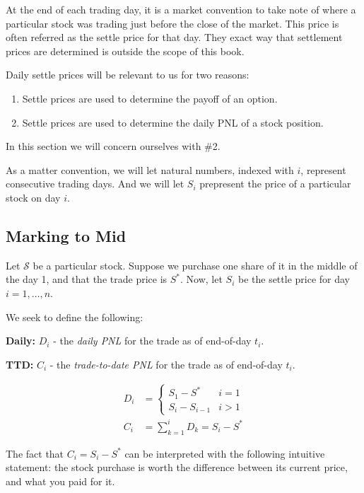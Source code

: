 \documentclass[11pt,]{krantz}
\begin{document}
At the end of each trading day, it is a market convention to take note of where a particular stock was trading just before the close of the market. This price is often referred as the settle price for that day. They exact way that settlement prices are determined is outside the scope of this book.

Daily settle prices will be relevant to us for two reasons:

\begin{enumerate}
\def\labelenumi{\arabic{enumi}.}
\item
  Settle prices are used to determine the payoff of an option.
\item
  Settle prices are used to determine the daily PNL of a stock position.
\end{enumerate}

In this section we will concern ourselves with \#2.

As a matter convention, we will let natural numbers, indexed with \(i\), represent consecutive trading days. And we will let \(S_{i}\) prepresent the price of a particular stock on day \(i\).

\subsection{Marking to Mid}\label{marking-to-mid}

Let \(\mathcal{S}\) be a particular stock. Suppose we purchase one share of it in the middle of the day 1, and that the trade price is \(S^{*}\). Now, let \(S_{i}\) be the settle price for day \(i=1,\ldots,n\).

We seek to define the following:

\textbf{Daily:} \(D_{i}\) - the \emph{daily PNL} for the trade as of end-of-day \(t_i\).

\textbf{TTD:} \(C_{i}\) - the \emph{trade-to-date PNL} for the trade as of end-of-day \(t_i\).

\begin{align*}
D_{i} &= \begin{cases} S_{1} - S^{*} & i = 1 \\ S_{i} - S_{i-1} & i > 1 \end{cases} \\[10pt]
C_{i} &= \sum_{k=1}^{i} D_{k} = S_{i} - S^{*}
\end{align*}

The fact that \(C_{i} = S_{i} - S^{*}\) can be interpreted with the following intuitive statement: the stock purchase is worth the difference between its current price, and what you paid for it.
\end{document}
